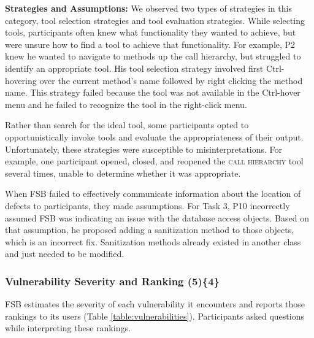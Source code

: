 \documentclass[10pt,journal,compsoc]{IEEEtran}
\begin{document}
\textbf{Strategies and Assumptions:}
We observed two types of strategies in this category, tool selection strategies and tool evaluation strategies. 
While selecting tools, participants often knew what functionality they wanted to achieve, but were unsure how to find a tool to achieve that functionality. For example, P2 knew he wanted to navigate to methods up the call hierarchy, but struggled to identify an appropriate tool. 
His tool selection strategy involved first Ctrl-hovering over the current method's name followed by right clicking the method name.
This strategy failed because the tool was not available in the Ctrl-hover menu and he failed to recognize the tool in the right-click menu.

Rather than search for the ideal tool, some participants opted to opportunistically invoke tools and evaluate the appropriateness of their output. Unfortunately, these strategies were susceptible to misinterpretations. For example, one participant opened, closed, and reopened the \textsc{call hierarchy} tool several times, unable to determine whether it was appropriate. 

When FSB failed to effectively communicate information about the location of defects to participants, they made assumptions.
For Task 3, P10 incorrectly assumed FSB was indicating an issue with the database access objects. 
Based on that assumption, he proposed adding a sanitization method to those objects, which is an incorrect fix.
Sanitization methods already existed in another class and just needed to be modified.





\subsubsection{Vulnerability Severity and Ranking (5)\{4\}}

\label{bsr}

FSB estimates the severity of each vulnerability it encounters and reports those rankings to its users (Table \ref{table:vulnerabilities}). 
Participants asked questions while interpreting these rankings.
\\
\end{document}
